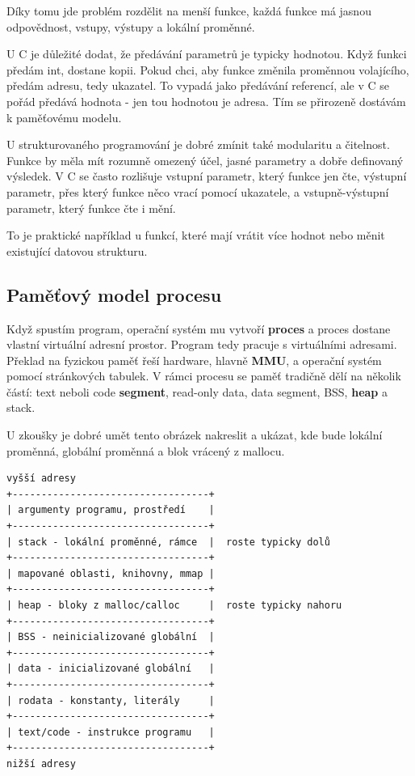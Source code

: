 Díky tomu jde problém rozdělit na menší funkce, každá funkce má jasnou odpovědnost, vstupy, výstupy a lokální proměnné.

U C je důležité dodat, že předávání parametrů je typicky hodnotou. Když funkci předám int, dostane kopii. Pokud chci, aby funkce změnila proměnnou volajícího, předám adresu, tedy ukazatel. To vypadá jako předávání referencí, ale v C se pořád předává hodnota - jen tou hodnotou je adresa. Tím se přirozeně dostávám k paměťovému modelu.

U strukturovaného programování je dobré zmínit také modularitu a čitelnost. Funkce by měla mít rozumně omezený účel, jasné parametry a dobře definovaný výsledek. V C se často rozlišuje vstupní parametr, který funkce jen čte, výstupní parametr, přes který funkce něco vrací pomocí ukazatele, a vstupně-výstupní parametr, který funkce čte i mění.

To je praktické například u funkcí, které mají vrátit více hodnot nebo měnit existující datovou strukturu.

\subsection*{Paměťový model procesu}

Když spustím program, operační systém mu vytvoří \textbf{proces} a proces dostane vlastní virtuální adresní prostor. Program tedy pracuje s virtuálními adresami. Překlad na fyzickou paměť řeší hardware, hlavně \textbf{MMU}, a operační systém pomocí stránkových tabulek. V rámci procesu se paměť tradičně dělí na několik částí: text neboli code \textbf{segment}, read-only data, data segment, BSS, \textbf{heap} a stack.

U zkoušky je dobré umět tento obrázek nakreslit a ukázat, kde bude lokální proměnná, globální proměnná a blok vrácený z mallocu.

\newpage
\begin{codebox}
\small
\begin{verbatim}
vyšší adresy
+----------------------------------+
| argumenty programu, prostředí    |
+----------------------------------+
| stack - lokální proměnné, rámce  |  roste typicky dolů
+----------------------------------+
| mapované oblasti, knihovny, mmap |
+----------------------------------+
| heap - bloky z malloc/calloc     |  roste typicky nahoru
+----------------------------------+
| BSS - neinicializované globální  |
+----------------------------------+
| data - inicializované globální   |
+----------------------------------+
| rodata - konstanty, literály     |
+----------------------------------+
| text/code - instrukce programu   |
+----------------------------------+
nižší adresy
\end{verbatim}
\end{codebox}

